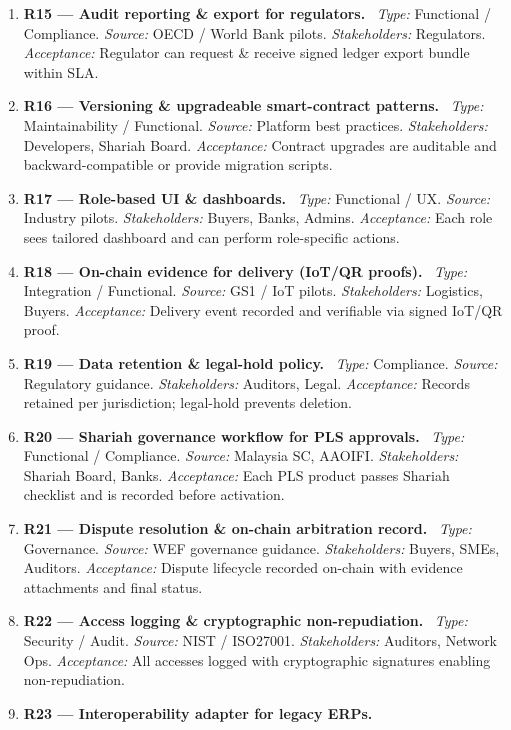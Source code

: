 \documentclass[11pt,a4paper]{article}
\begin{document}
\begin{enumerate}[label=R\arabic*:,leftmargin=*,itemsep=6pt]
\item \textbf{R15 — Audit reporting \& export for regulators.} \
\textit{Type:} Functional / Compliance. \textit{Source:} OECD / World Bank pilots. \textit{Stakeholders:} Regulators. \textit{Acceptance:} Regulator can request \& receive signed ledger export bundle within SLA.
\item \textbf{R16 — Versioning \& upgradeable smart-contract patterns.} \
\textit{Type:} Maintainability / Functional. \textit{Source:} Platform best practices. \textit{Stakeholders:} Developers, Shariah Board. \textit{Acceptance:} Contract upgrades are auditable and backward-compatible or provide migration scripts.
\item \textbf{R17 — Role-based UI \& dashboards.} \
\textit{Type:} Functional / UX. \textit{Source:} Industry pilots. \textit{Stakeholders:} Buyers, Banks, Admins. \textit{Acceptance:} Each role sees tailored dashboard and can perform role-specific actions.
\item \textbf{R18 — On-chain evidence for delivery (IoT/QR proofs).} \
\textit{Type:} Integration / Functional. \textit{Source:} GS1 / IoT pilots. \textit{Stakeholders:} Logistics, Buyers. \textit{Acceptance:} Delivery event recorded and verifiable via signed IoT/QR proof.
\item \textbf{R19 — Data retention \& legal-hold policy.} \
\textit{Type:} Compliance. \textit{Source:} Regulatory guidance. \textit{Stakeholders:} Auditors, Legal. \textit{Acceptance:} Records retained per jurisdiction; legal-hold prevents deletion.
\item \textbf{R20 — Shariah governance workflow for PLS approvals.} \
\textit{Type:} Functional / Compliance. \textit{Source:} Malaysia SC, AAOIFI. \textit{Stakeholders:} Shariah Board, Banks. \textit{Acceptance:} Each PLS product passes Shariah checklist and is recorded before activation.
\item \textbf{R21 — Dispute resolution \& on-chain arbitration record.} \
\textit{Type:} Governance. \textit{Source:} WEF governance guidance. \textit{Stakeholders:} Buyers, SMEs, Auditors. \textit{Acceptance:} Dispute lifecycle recorded on-chain with evidence attachments and final status.
\item \textbf{R22 — Access logging \& cryptographic non-repudiation.} \
\textit{Type:} Security / Audit. \textit{Source:} NIST / ISO27001. \textit{Stakeholders:} Auditors, Network Ops. \textit{Acceptance:} All accesses logged with cryptographic signatures enabling non-repudiation.
\item \textbf{R23 — Interoperability adapter for legacy ERPs.} \

\end{enumerate}
\end{document}
